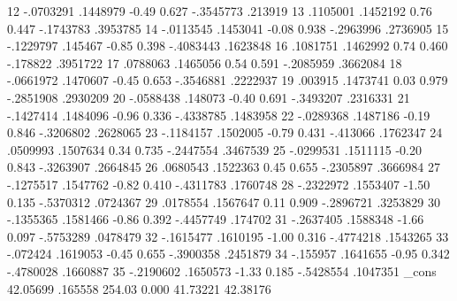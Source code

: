          12  {\VBAR}  -.0703291   .1448979    -0.49   0.627    -.3545773     .213919
         13  {\VBAR}   .1105001   .1452192     0.76   0.447    -.1743783    .3953785
         14  {\VBAR}  -.0113545   .1453041    -0.08   0.938    -.2963996    .2736905
         15  {\VBAR}  -.1229797    .145467    -0.85   0.398    -.4083443    .1623848
         16  {\VBAR}   .1081751   .1462992     0.74   0.460     -.178822    .3951722
         17  {\VBAR}   .0788063   .1465056     0.54   0.591    -.2085959    .3662084
         18  {\VBAR}  -.0661972   .1470607    -0.45   0.653    -.3546881    .2222937
         19  {\VBAR}    .003915   .1473741     0.03   0.979    -.2851908    .2930209
         20  {\VBAR}  -.0588438    .148073    -0.40   0.691    -.3493207    .2316331
         21  {\VBAR}  -.1427414   .1484096    -0.96   0.336    -.4338785    .1483958
         22  {\VBAR}  -.0289368   .1487186    -0.19   0.846    -.3206802    .2628065
         23  {\VBAR}  -.1184157   .1502005    -0.79   0.431     -.413066    .1762347
         24  {\VBAR}   .0509993   .1507634     0.34   0.735    -.2447554    .3467539
         25  {\VBAR}  -.0299531   .1511115    -0.20   0.843    -.3263907    .2664845
         26  {\VBAR}   .0680543   .1522363     0.45   0.655    -.2305897    .3666984
         27  {\VBAR}  -.1275517   .1547762    -0.82   0.410    -.4311783    .1760748
         28  {\VBAR}  -.2322972   .1553407    -1.50   0.135    -.5370312    .0724367
         29  {\VBAR}   .0178554   .1567647     0.11   0.909    -.2896721    .3253829
         30  {\VBAR}  -.1355365   .1581466    -0.86   0.392    -.4457749     .174702
         31  {\VBAR}  -.2637405   .1588348    -1.66   0.097    -.5753289    .0478479
         32  {\VBAR}  -.1615477   .1610195    -1.00   0.316    -.4774218    .1543265
         33  {\VBAR}   -.072424   .1619053    -0.45   0.655    -.3900358    .2451879
         34  {\VBAR}   -.155957   .1641655    -0.95   0.342    -.4780028    .1660887
         35  {\VBAR}  -.2190602   .1650573    -1.33   0.185    -.5428554    .1047351
             {\VBAR}
       _cons {\VBAR}   42.05699    .165558   254.03   0.000     41.73221    42.38176
